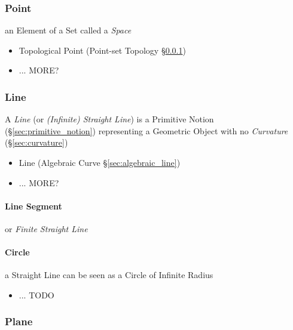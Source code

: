 \subsubsection{Point}\label{sec:point}

an Element of a Set called a \emph{Space}

\begin{itemize}
  \item Topological Point (Point-set Topology \S\ref{sec:point})
  \item ... MORE?
\end{itemize}



\subsubsection{Line}\label{sec:line}

A \emph{Line} (or \emph{(Infinite) Straight Line}) is a Primitive Notion
(\S\ref{sec:primitive_notion}) representing a Geometric Object with no
\emph{Curvature} (\S\ref{sec:curvature})

\begin{itemize}
  \item Line (Algebraic Curve \S\ref{sec:algebraic_line})
  \item ... MORE?
\end{itemize}



\paragraph{Line Segment}\label{sec:line_segment}\hfill

or \emph{Finite Straight Line}



\paragraph{Circle}\label{sec:circle}\hfill

a Straight Line can be seen as a Circle of Infinite Radius

\begin{itemize}
  \item ... TODO
\end{itemize}



\subsubsection{Plane}\label{sec:plane}



